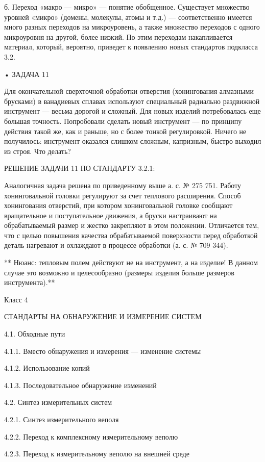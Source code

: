 б. Переход «макро — микро»  — понятие обобщенное. Существует множество
уровней  «микро» (домены,  молекулы,  атомы и  т.д.) —  соответственно
имеется  много разных  переходов  на микроуровень,  а также  множество
переходов  с  одного микроуровня  на  другой,  более низкий.  По  этим
переходам  накапливается  материал,   который,  вероятно,  приведет  к
появлению новых стандартов подкласса 3.2.


• ЗАДАЧА 11

Для  окончательной   сверхточной  обработки   отверстия  (хонингования
алмазными  брусками)  в   ванадиевых  сплавах  используют  специальный
радиально раздвижной инструмент — весьма  дорогой и сложный. Для новых
изделий потребовалась еще большая  точность. Попробовали сделать новый
инструмент — по  принципу действия такой же, как и  раньше, но с более
тонкой регулировкой. Ничего не получилось: инструмент оказался слишком
сложным, капризным, быстро выходил из строя. Что делать?


РЕШЕНИЕ ЗАДАЧИ 11 ПО СТАНДАРТУ 3.2.1:

Аналогичная задача решена по приведенному выше а. с. № 275 751. Работу
хонинговальной головки регулируют за счет теплового расширения. Способ
хонингования  отверстий, при  котором хонинговальной  головке сообщают
вращательное  и  поступательное  движения,  а  бруски  настраивают  на
обрабатываемый размер и жестко закрепляют в этом положении. Отличается
тем, что  с целью повышения качества  обрабатываемой поверхности перед
обработкой деталь нагревают и охлаждают  в процессе обработки (а. с. №
709 344).

** Нюанс: тепловым  полем действуют не на инструмент, а  на изделие! В
данном  случае это  возможно и  целесообразно (размеры  изделия больше
размеров инструмента).**


Класс 4

СТАНДАРТЫ НА ОБНАРУЖЕНИЕ И ИЗМЕРЕНИЕ СИСТЕМ

4.1. Обходные пути

4.1.1. Вместо обнаружения и измерения — изменение системы

4.1.2. Использование копий

4.1.3. Последовательное обнаружение изменений

4.2. Синтез измерительных систем

4.2.1. Синтез измерительного веполя

4.2.2. Переход к комплексному измерительному веполю

4.2.3. Переход к измерительному веполю на внешней среде

